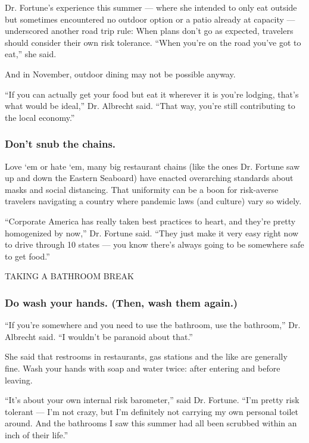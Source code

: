 Dr. Fortune's experience this summer --- where she intended to only eat
outside but sometimes encountered no outdoor option or a patio already
at capacity --- underscored another road trip rule: When plans don't go
as expected, travelers should consider their own risk tolerance. ``When
you're on the road you've got to eat,'' she said.

And in November, outdoor dining may not be possible anyway.

``If you can actually get your food but eat it wherever it is you're
lodging, that's what would be ideal,'' Dr. Albrecht said. ``That way,
you're still contributing to the local economy.''

\hypertarget{dont-snub-the-chains}{%
\subsubsection{\texorpdfstring{\textbf{Don't snub the
chains.}}{Don't snub the chains.}}\label{dont-snub-the-chains}}

Love `em or hate `em, many big restaurant chains (like the ones Dr.
Fortune saw up and down the Eastern Seaboard) have enacted overarching
standards about masks and social distancing. That uniformity can be a
boon for risk-averse travelers navigating a country where pandemic laws
(and culture) vary so widely.

``Corporate America has really taken best practices to heart, and
they're pretty homogenized by now,'' Dr. Fortune said. ``They just make
it very easy right now to drive through 10 states --- you know there's
always going to be somewhere safe to get food.''

TAKING A BATHROOM BREAK

\hypertarget{do-wash-your-hands-then-wash-them-again}{%
\subsubsection{\texorpdfstring{\textbf{Do wash your hands. (Then, wash
them
again.)}}{Do wash your hands. (Then, wash them again.)}}\label{do-wash-your-hands-then-wash-them-again}}

``If you're somewhere and you need to use the bathroom, use the
bathroom,'' Dr. Albrecht said. ``I wouldn't be paranoid about that.''

She said that restrooms in restaurants, gas stations and the like are
generally fine. Wash your hands with soap and water twice: after
entering and before leaving.

``It's about your own internal risk barometer,'' said Dr. Fortune. ``I'm
pretty risk tolerant --- I'm not crazy, but I'm definitely not carrying
my own personal toilet around. And the bathrooms I saw this summer had
all been scrubbed within an inch of their life.''

